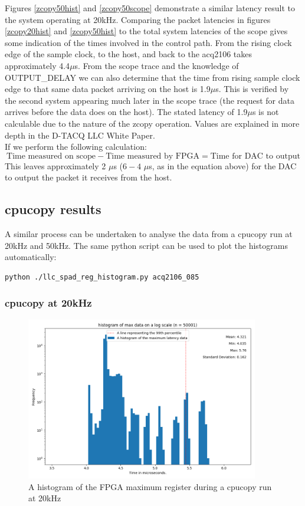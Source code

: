\documentclass{article}
\begin{document}
Figures \ref{zcopy50hist} and \ref{zcopy50scope} demonstrate a similar latency result to the system operating at 20kHz.
Comparing the packet latencies in figures \ref{zcopy20hist} and \ref{zcopy50hist} to the total system latencies of the scope gives some indication of the times involved in the control path.
From the rising clock edge of the sample clock, to the host, and back to the acq2106 takes approximately 4.4$\mu$s.
From the scope trace and the knowledge of OUTPUT\_DELAY we can also determine that the time from rising sample clock edge to that same data packet arriving on the host is 1.9$\mu$s.
This is verified by the second system appearing much later in the scope trace (the request for data arrives before the data does on the host).
The stated latency of 1.9$\mu$s is not calculable due to the nature of the zcopy operation. Values are explained in more depth in the \mbox{D-TACQ}  LLC White Paper. \\
If we perform the following calculation:
\begin{equation}
\text{Time measured on scope} - \text{Time measured by FPGA} = \text{Time for DAC to output}
\end{equation}
This leaves approximately 2 $\mu$s ($6-4$  $\mu$s, as in the equation above) for the DAC to output the packet it receives from the host.

\newpage

\subsection{cpucopy results}
A similar process can be undertaken to analyse the data from a cpucopy run at 20kHz and 50kHz.
The same python script can be used to plot the histograms automatically:

\begin{verbatim}
python ./llc_spad_reg_histogram.py acq2106_085
\end{verbatim}

\subsubsection{cpucopy at 20kHz}

\begin{figure} [htb!]
	\centering
	\includegraphics[width=4.0in]{images/better_images/20k_cpu.png}
	\caption{A histogram of the FPGA maximum register during a cpucopy run at 20kHz}
	\label{cpu20hist}
\end{figure}
\end{document}
